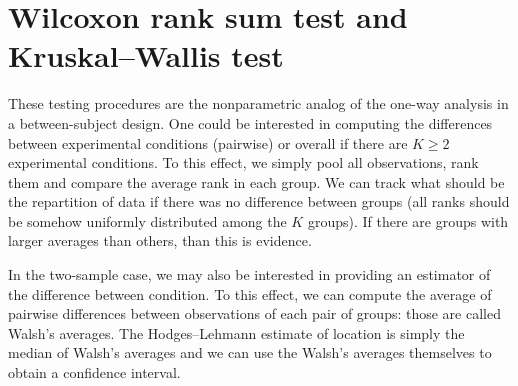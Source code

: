 \documentclass[
  11pt,
  letterpaper,
]{scrbook}
\theoremstyle{definition}
\theoremstyle{remark}
\begin{document}
\hypertarget{wilcoxon-rank-sum-test-and-kruskalwallis-test}{%
\section{Wilcoxon rank sum test and Kruskal--Wallis
test}\label{wilcoxon-rank-sum-test-and-kruskalwallis-test}}

These testing procedures are the nonparametric analog of the one-way
analysis in a between-subject design. One could be interested in
computing the differences between experimental conditions (pairwise) or
overall if there are \(K \geq 2\) experimental conditions. To this
effect, we simply pool all observations, rank them and compare the
average rank in each group. We can track what should be the repartition
of data if there was no difference between groups (all ranks should be
somehow uniformly distributed among the \(K\) groups). If there are
groups with larger averages than others, than this is evidence.

In the two-sample case, we may also be interested in providing an
estimator of the difference between condition. To this effect, we can
compute the average of pairwise differences between observations of each
pair of groups: those are called Walsh's averages. The Hodges--Lehmann
estimate of location is simply the median of Walsh's averages and we can
use the Walsh's averages themselves to obtain a confidence interval.
\end{document}
